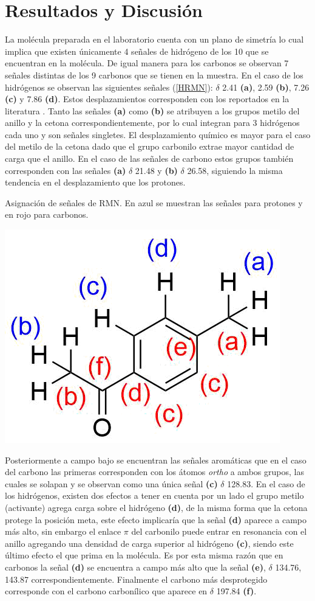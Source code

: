 \documentclass[fleqn,11pt]{SelfArx}
\begin{document}
\section{Resultados y Discusi\'on}
La molécula preparada en el laboratorio cuenta con un plano de simetría lo cual implica que existen únicamente 4 señales de hidrógeno de los 10 que se encuentran en la molécula. De igual manera para los carbonos se observan 7 señales distintas de los 9 carbonos que se tienen en la muestra. En el caso de los hidrógenos se observan las siguientes señales (\autoref{HRMN}): $\delta$ 2.41 \textbf{(a)}, 2.59 \textbf{(b)}, 7.26 \textbf{(c)} y 7.86 \textbf{(d)}. Estos desplazamientos corresponden con los reportados en la literatura \cite{Liu2010, Sharghi2010}. Tanto las señales \textbf{(a)} como \textbf{(b)} se atribuyen a los grupos metilo del anillo y la cetona correspondientemente, por lo cual integran para 3 hidrógenos cada uno y son señales singletes. El desplazamiento químico es mayor para el caso del metilo de la cetona dado que el grupo carbonilo extrae mayor cantidad de carga que el anillo. En el caso de las señales de carbono estos grupos también corresponden con las señales \textbf{(a)} $\delta$ 21.48 y \textbf{(b)} $\delta$ 26.58, siguiendo la misma tendencia en el desplazamiento que los protones.
\begin{scheme}[h]
	\centering
	\caption{Asignación de señales de RMN. En azul se muestran las señales para protones y en rojo para carbonos.}
	\includegraphics[width=0.45\linewidth]{structures/asignacion.png}
\end{scheme}

Posteriormente a campo bajo se encuentran las señales aromáticas que en el caso del carbono las primeras corresponden con los átomos \textit{ortho} a ambos grupos, las cuales se solapan y se observan como una única señal \textbf{(c)} $\delta$ 128.83. En el caso de los hidrógenos, existen dos efectos a tener en cuenta por un lado el grupo metilo (activante) agrega carga sobre el hidrógeno \textbf{(d)}, de la misma forma que la cetona protege la posición meta, este efecto implicaría que la señal \textbf{(d)} aparece a campo más alto, sin embargo el enlace $\pi$ del carbonilo puede entrar en resonancia con el anillo agregando una densidad de carga superior al hidrógeno \textbf{(c)}, siendo este último efecto el que prima en la molécula. Es por esta misma razón que en carbonos la señal \textbf{(d)} se encuentra a campo más alto que la señal \textbf{(e)}, $\delta$ 134.76, 143.87 correspondientemente. Finalmente el carbono más desprotegido corresponde con el carbono carbonílico que aparece en $\delta$ 197.84 \textbf{(f)}.
\end{document}

